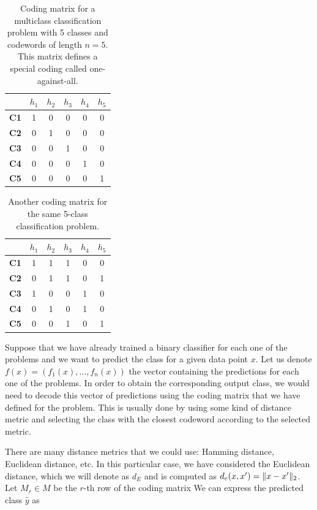 \begin{table}[H]
\centering
\begin{tabular}{c|ccccc}
            & $h_1$ & $h_2$ & $h_3$ & $h_4$ & $h_5$ \\ \hline
\textbf{C1} & 1     & 0     & 0     & 0     & 0     \\
\textbf{C2} & 0     & 1     & 0     & 0     & 0     \\
\textbf{C3} & 0     & 0     & 1     & 0     & 0     \\
\textbf{C4} & 0     & 0     & 0     & 1     & 0     \\
\textbf{C5} & 0     & 0     & 0     & 0     & 1    
\end{tabular}%
\caption{Coding matrix for a multiclass classification problem with 5 classes and codewords of length $n=5$.
This matrix defines a special coding called one-against-all.}
\label{tab:ecoc_example_identity}
\end{table}


\begin{table}[H]
\centering
\begin{tabular}{c|ccccc}
            & $h_1$ & $h_2$ & $h_3$ & $h_4$ & $h_5$ \\ \hline
\textbf{C1} & 1     & 1     & 1     & 0     & 0     \\
\textbf{C2} & 0     & 1     & 1     & 0     & 1     \\
\textbf{C3} & 1     & 0     & 0     & 1     & 0     \\
\textbf{C4} & 0     & 1     & 0     & 1     & 0     \\
\textbf{C5} & 0     & 0     & 1     & 0     & 1    
\end{tabular}
\caption{Another coding matrix for the same 5-class classification problem.}
\label{tab:ecoc_example_complex}
\end{table}

Suppose that we have already trained a binary classifier for each one of the problems and we want to
predict the class for a given data point $x$. Let us denote $f(x) = (f_1(x), \dots, f_n(x))$ the
vector containing the predictions for each one of the problems. In order to obtain the corresponding output
class, we would need to decode this vector of predictions using the coding matrix that we have defined
for the problem. This is usually done by using some kind of distance metric and selecting the class with
the closest codeword according to the selected metric.

There are many distance metrics that we could use: Hamming distance, Euclidean distance, etc. In this
particular case, we have considered the Euclidean distance, which we will denote as $d_E$ and is computed
as $d_e(x, x') = \lVert x - x' \rVert_2$. Let $M_r \in M$ be the $r$-th row of the coding matrix
We can express the predicted class $\hat{y}$ as

